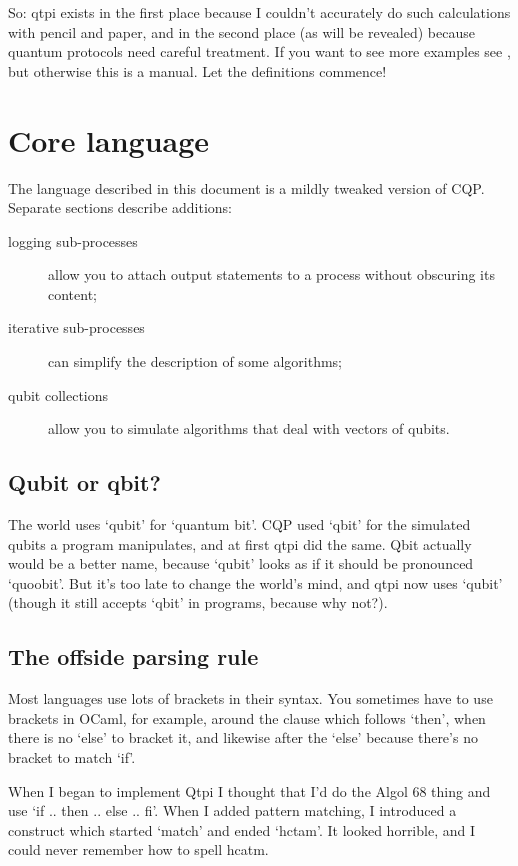 \documentclass[11pt,a4paper]{article}
\begin{document}
So: qtpi exists in the first place because I couldn't accurately do such calculations with pencil and paper, and in the second place (as will be revealed) because quantum protocols need careful treatment. If you want to see more examples see , but otherwise this is a manual. Let the definitions commence!

\section{Core language}

The language described in this document is a mildly tweaked version of CQP. Separate sections describe additions:  

\begin{description}
\item[logging sub-processes] allow you to attach output statements to a process without obscuring its content;  
\item[iterative sub-processes] can simplify the description of some algorithms;  
\item[qubit collections] allow you to simulate algorithms that deal with vectors of qubits.
\end{description}
 
\subsection{Qubit or qbit?}
The world uses `qubit' for `quantum bit'. CQP used `qbit' for the simulated qubits a program manipulates, and at first qtpi did the same. Qbit actually would be a better name, because `qubit' looks as if it should be pronounced `quoobit'. But it's too late to change the world's mind, and qtpi now uses `qubit' (though it still accepts `qbit' in programs, because why not?).

\subsection{The offside parsing rule}

Most languages use lots of brackets in their syntax. You sometimes have to use brackets in OCaml, for example, around the clause which follows `then', when there is no `else' to bracket it, and likewise after the `else' because there's no bracket to match `if'.

When I began to implement Qtpi I thought that I'd do the Algol 68 thing and use `if .. then .. else .. fi'. When I added pattern matching, I introduced a construct which started `match' and ended `hctam'. It looked horrible, and I could never remember how to spell hcatm.
\end{document}
